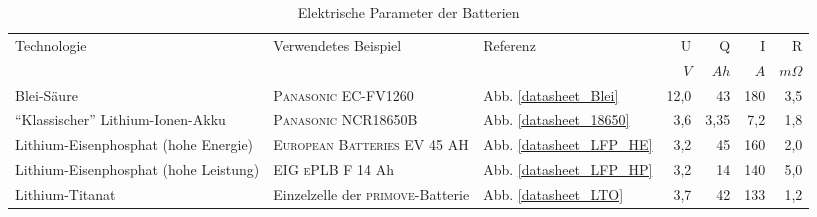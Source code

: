\begin{table}\centering
	\begin{tabulary}{\textwidth}{LLlRRRR}
		\toprule
		Technologie                           & Verwendetes Beispiel                      & Referenz                        &    U &    Q &   I &         R \\
		                                      &                                           &                             &  $V$ & $Ah$ & $A$ & $m\Omega$ \\ \midrule
		Blei-Säure                            & \textsc{Panasonic} EC-FV1260              & Abb. \ref{datasheet_Blei}   & 12,0 &   43 & 180 &       3,5 \\
		"`Klassischer"' Lithium-Ionen-Akku    & \textsc{Panasonic} NCR18650B              & Abb. \ref{datasheet_18650}  &  3,6 & 3,35 & 7,2 &       1,8 \\
		Lithium-Eisenphosphat (hohe Energie)  & \textsc{European Batteries} EV 45 AH      & Abb. \ref{datasheet_LFP_HE} &  3,2 &   45 & 160 &       2,0 \\
		Lithium-Eisenphosphat (hohe Leistung) & \textsc{EIG ePLB} F 14 Ah                 & Abb. \ref{datasheet_LFP_HP} &  3,2 &   14 & 140 &       5,0 \\
		Lithium-Titanat                       & Einzelzelle der \textsc{primove}-Batterie & Abb. \ref{datasheet_LTO}    &  3,7 &   42 & 133 &       1,2 \\ \bottomrule
	\end{tabulary}
	\caption{Elektrische Parameter der Batterien}
	\label{vergleichstabellen_speichertechnologien_1}
\end{table}

